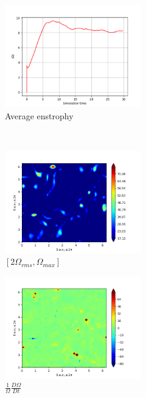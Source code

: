 \begin{figure}[H]
    \begin{subfigure}[H]{0.45\textwidth}
        \includegraphics[height=1.75in]{media/run-cds-65/enst-average1330.png}
        \caption{Average enstrophy}
    \end{subfigure}
    ~
    \begin{subfigure}[H]{0.45\textwidth}
        \includegraphics[height=1.75in]{media/run-cds-65/enst-2-1330.png}
        \caption{$[2\Omega_{rms}, \Omega_{max} ]$ }
    \end{subfigure}
    \newline
    \begin{subfigure}[H]{0.45\textwidth}
        \includegraphics[height=1.75in]{media/run-cds-65/enst-1330.png}
        \caption{$\frac{1}{\Omega} \frac{D \Omega}{Dt}$}
    \end{subfigure}
    ~
    \begin{subfigure}{0.45\textwidth}

\end{subfigure}
\end{figure}
